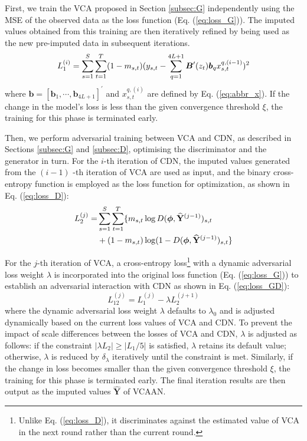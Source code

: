 \documentclass[3p,11pt,authoryear]{elsarticle}
\begin{document}
First, we train the VCA proposed in Section \ref{subsec:G} independently using the MSE of the observed data as the loss function (Eq. (\ref{eq:loss_G})). The imputed values obtained from this training are then iteratively refined by being used as the new pre-imputed data in subsequent iterations. 
\begin{equation}\label{eq:loss_G}
	L_1^{(i)} = \sum_{s=1}^{S} \sum_{t=1}^{T} (1-m_{s,t}) (y_{s,t} 
	-  \sum_{q=1}^{4L+1} \boldsymbol{B}^{\prime}(z_t) \boldsymbol{b}_q x_{s,t}^{q, (i-1)} )^2 \\
\end{equation}
where $\boldsymbol{b}=[\boldsymbol{b}_1,\cdots,\boldsymbol{b}_{4L+1}]^{\prime}$ and $x^{q, (i)}_{s,t}$ are defined by Eq. (\ref{eq:abbr_x}). If the change in the model's loss is less than the given convergence threshold $\xi$, the training for this phase is terminated early. 

Then, we perform adversarial training between VCA and CDN, as described in Sections \ref{subsec:G} and \ref{subsec:D}, optimising the discriminator and the generator in turn. 
For the $i$-th iteration of CDN, the imputed values generated from the $(i-1)$ -th iteration of VCA are used as input, and the binary cross-entropy function is employed as the loss function for optimization, as shown in Eq. (\ref{eq:loss_D}):
\begin{align}\label{eq:loss_D}
	L_2^{(j)} = &\sum_{s=1}^{S} \sum_{t=1}^{T} 
	\{m_{s,t} \log D(\boldsymbol{\phi}, \widehat{\mathbf{Y}}^{(j-1)})_{s,t} \notag \\
	&+(1-m_{s,t}) \log (1-D(\boldsymbol{\phi}, \widehat{\mathbf{Y}}^{(j-1)})_{s,t}\}
\end{align}

For the $j$-th iteration of VCA, a cross-entropy loss\footnote{Unlike Eq. (\ref{eq:loss_D}), it discriminates against the estimated value of VCA in the next round rather than the current round. } with a dynamic adversarial loss weight $\lambda$ is incorporated into the original loss function (Eq. (\ref{eq:loss_G})) to establish an adversarial interaction with CDN as shown in Eq. (\ref{eq:loss_GD}): 
\begin{equation}\label{eq:loss_GD}
	L_{12}^{(j)} = L_{1}^{(j)} - \lambda L_2^{(j+1)}
\end{equation}
where the dynamic adversarial loss weight $\lambda$ defaults to $\lambda_0$ and is adjusted dynamically based on the current loss values of VCA and CDN. To prevent the impact of scale differences between the losses of VCA and CDN, $\lambda$ is adjusted as follows: if the constraint $|\lambda L_2| \geq |L_1 / 5|$ is satisfied, $\lambda$ retains its default value; otherwise, $\lambda$ is reduced by $\delta_\lambda$ iteratively until the constraint is met. Similarly, if the change in loss becomes smaller than the given convergence threshold $\xi$, the training for this phase is terminated early. The final iteration results are then output as the imputed values $\widehat{\mathbf{Y}}$ of VCAAN. 
\end{document}
